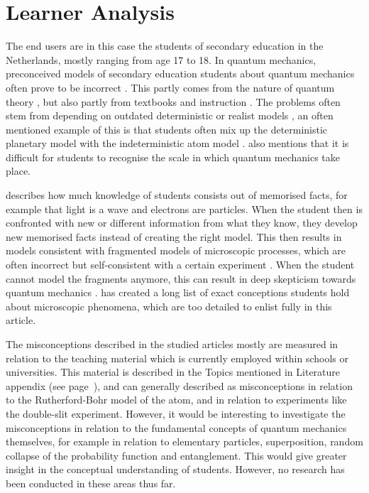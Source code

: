 \documentclass[11pt,twoside]{report} %
\begin{document}
\section{Learner Analysis}
\label{ch:learneranalysis}

The end users are in this case the students of secondary education in the Netherlands, mostly ranging from age 17 to 18. In quantum mechanics, preconceived models of secondary education students about quantum mechanics often prove to be incorrect \cite{asikainen, papaphotis2, thacker}. This partly comes from the nature of quantum theory \cite{papaphotis2}, but also partly from textbooks and instruction \cite{hubber, papaphotis2}. The problems often stem from depending on outdated deterministic or realist models \cite{hubber, papaphotis1, papaphotis2}, an often mentioned example of this is that students often mix up the deterministic planetary model with the indeterministic atom model \cite{dori, henriksen, hubber, muller, papaphotis1, papaphotis2}.  also mentions that it is difficult for students to recognise the scale in which quantum mechanics take place.

 describes how much knowledge of students consists out of memorised facts, for example that light is a wave and electrons are particles. When the student then is confronted with new or different information from what they know, they develop new memorised facts instead of creating the right model. This then results in models consistent with fragmented models of microscopic processes, which are often incorrect but self-consistent with a certain experiment \cite{hubber, thacker}. When the student cannot model the fragments anymore, this can result in deep skepticism towards quantum mechanics \cite{barnes, henriksen, levrini}.  has created a long list of exact conceptions students hold about microscopic phenomena, which are too detailed to enlist fully in this article.

The misconceptions described in the studied articles mostly are measured in relation to the teaching material which is currently employed within schools or universities. This material is described in the Topics mentioned in Literature appendix (see page~\pageref{app:topicsliterature}), and can generally described as misconceptions in relation to the Rutherford-Bohr model of the atom, and in relation to experiments like the double-slit experiment. However, it would be interesting to investigate the misconceptions in relation to the fundamental concepts of quantum mechanics themselves, for example in relation to elementary particles, superposition, random collapse of the probability function and entanglement. This would give greater insight in the conceptual understanding of students. However, no research has been conducted in these areas thus far.
\end{document}

